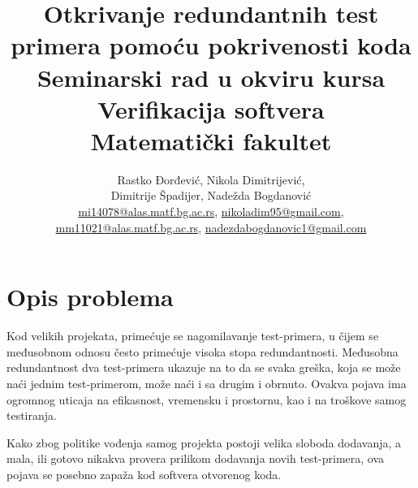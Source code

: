 \documentclass[a4paper]{article}
\begin{document}
\title{Otkrivanje redundantnih test primera pomoću pokrivenosti koda\\ \small{Seminarski rad u okviru kursa Verifikacija softvera\\ Matematički fakultet}}

\author{Rastko Đorđević, Nikola Dimitrijević,\\
Dimitrije Špadijer, Nadežda Bogdanović\\
\href{mailto:mi14078@alas.matf.bg.ac.rs}{mi14078@alas.matf.bg.ac.rs}, \href{mailto:nikoladim95@gmail.com}{nikoladim95@gmail.com},\\ \href{mailto:mm11021@alas.matf.bg.ac.rs}{mm11021@alas.matf.bg.ac.rs}, 
\href{mailto:nadezdabodanovic1@gmail.com}{nadezdabogdanovic1@gmail.com}}


\maketitle


\tableofcontents

\newpage

\section{Opis problema}
\label{sec:opis_problema}

Kod velikih projekata, primećuje se nagomilavanje test-primera, u čijem se međusobnom odnosu često primećuje visoka stopa redundantnosti. Međusobna redundantnost dva test-primera ukazuje na to da se svaka greška, koja se može naći jednim test-primerom, može naći i sa drugim i obrnuto.
Ovakva pojava ima ogromnog uticaja na efikasnost, vremensku i prostornu, kao i na troškove samog testiranja.

Kako zbog politike vođenja samog projekta postoji velika sloboda dodavanja, a mala, ili gotovo nikakva provera prilikom dodavanja novih test-primera, ova pojava se posebno zapaža kod softvera otvorenog koda.
\end{document}
